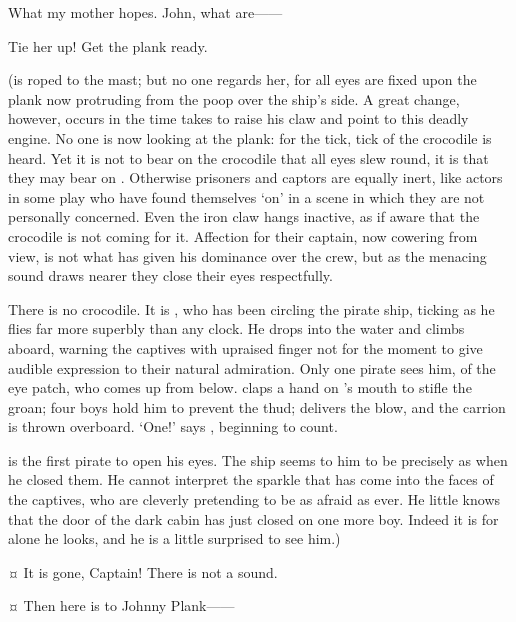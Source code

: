 \begin{drama}
\firsttwinspeaks
What my mother hopes.
John, what are——

\hookspeaks
Tie her up!
Get the plank ready.

\begin{stagedir}
(\wendy is roped to the mast;
but no one regards her, for all eyes are fixed upon the plank now protruding from the poop over the ship’s side.
A great change, however, occurs in the time \hook takes to raise his claw and point to this deadly engine.
No one is now looking at the plank: for the tick, tick of the crocodile is heard.
Yet it is not to bear on the crocodile that all eyes slew round, it is that they may bear on \hook.
Otherwise prisoners and captors are equally inert,
like actors in some play who have found themselves ‘on’ in a scene in which they are not personally concerned.
Even the iron claw hangs inactive, as if aware that the crocodile is not coming for it.
Affection for their captain, now cowering from view, is not what has given \hook his dominance over the crew,
but as the menacing sound draws nearer they close their eyes respectfully.

There is no crocodile.
It is \peter, who has been circling the pirate ship, ticking as he flies far more superbly than any clock.
He drops into the water and climbs aboard, warning the captives with upraised finger 
not for the moment to give audible expression to their natural admiration.
Only one pirate sees him,  of the eye patch, who comes up from below.
\john claps a hand on ’s mouth to stifle the groan;
four boys hold him to prevent the thud;
\peter delivers the blow, and the carrion is thrown overboard.
‘One!\@’ says \slightly, beginning to count.

\starkey is the first pirate to open his eyes.
The ship seems to him to be precisely as when he closed them.
He cannot interpret the sparkle that has come into the faces of the captives,
who are cleverly pretending to be as afraid as ever.
He little knows that the door of the dark cabin has just closed on one more boy.
Indeed it is for \hook alone he looks, and he is a little surprised to see him.)
\end{stagedir}

\starkeyspeaks {}¤
It is gone, Captain!
There is not a sound.


\hookspeaks {}¤
Then here is to Johnny Plank——


\end{drama}
